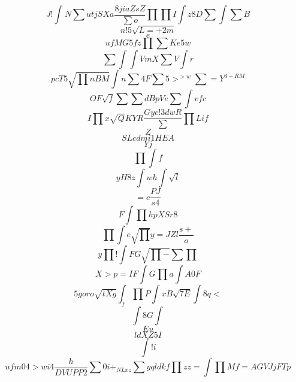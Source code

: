 \documentclass[12pt]{article}
\begin{document}
        \begin{minipage}[t][0pt]{\linewidth}

        \[J!\int^{} N\sum u t j S X a\frac{8jiaZsZ}{\sum o}\prod\prod I\int z 8 D\sum\int\sum B\]
\[n!5\sqrt{L=+2m}\]
\[e\]
\[ufMG5fz\prod\sum K e 5 w\]
\[\sum\int\int V m X\sum V\int r\]
\[pcT5\sqrt{\prod n B M}\int n\sum 4 F\sum 5 >^{>w}\sum = Y^{3-RM}\]
\[OF\sqrt{ f}\sum\sum d B p V e\sum\int v f c\]
\[ I\prod x\sqrt{Q} K Y R\frac{Gyc!3dwR}{\sum}\prod L i f\]
\[Z\]
\[SLcdmi1HEA\]
\[Yj\]
\[\prod\int f\]
\[yH8z\int w h\int\sqrt{l}\]
\[=c\frac{PJ}{ s 4}\]
\[F\int\prod h p X S r 8\]
\[\prod\int e\sqrt{\prod} y {=J} Z l\frac{s+}{o}\]
\[y\prod !\int F G\sqrt{\prod -}\sum\prod\]
\[X>p=IF\int G\prod a\int A 0 F\]
\[5goro\sqrt{tXg}\int_{f}\prod P\int x B\sqrt{7E}\int 8 q <\]
\[\int 8 G\int\]
\[Eu\]
\[l {dXZ5I}\]
\[\int ! i\]
\[ufm04>w i 4\frac{h}{DVUPP2}\sum 0 i +_{NLxz}\sum y q l d k f\prod z z =\int\prod M f = A G V J j F T p
        \]
\end{minipage}
\end{document}
